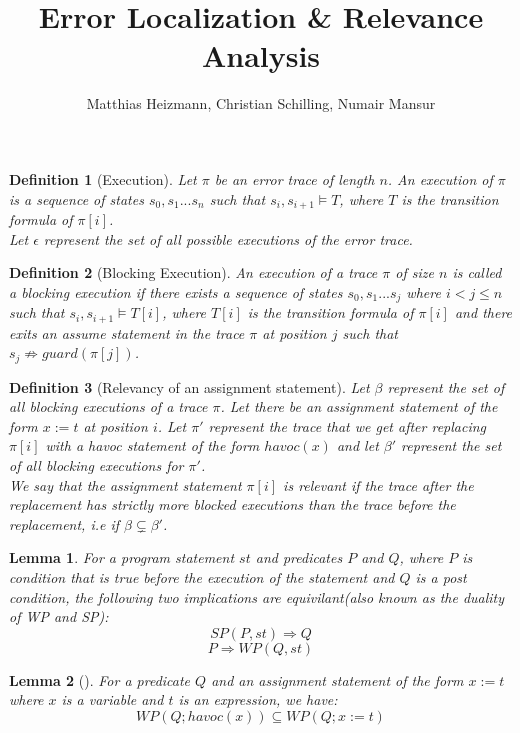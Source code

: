 \documentclass{article}
\title{Error Localization \& Relevance Analysis \\ }
\author{Matthias Heizmann, Christian Schilling, Numair Mansur}
\affil{University of Freiburg, Germany}
\date{\vspace{-5ex}}
\newcommand{\limp}{\Rightarrow}
\newtheorem{mydef}{Definition}
\newtheorem{lemma}{Lemma}
\begin{document}
\begin{mydef}[Execution]\label{mydef:execution_definition}
Let $\pi$ be an error trace of length $n$. An execution of $\pi$ is a sequence of states $s_0, s_1...s_n$ such that $s_i, s_{i+1} \models T$, where $T$ is the transition formula of $\pi[i]$. \\
Let $\epsilon$ represent the set of all possible executions of the error trace.
\end{mydef}

\begin{mydef}[Blocking Execution]\label{mydef:blockingexecution_definition}
An execution of a trace $\pi$ of size $n$ is called a blocking execution if there exists a sequence of states $s_0, s_1...s_j$ where $i<j \leq n$ such that $s_i, s_{i+1} \models T[i]$, where $T[i]$ is the transition formula of $\pi[i]$ and there exits an assume statement in the trace $\pi$ at position $j$ such that $s_{j} \not \limp guard(\pi[j])$.
\end{mydef}

\begin{mydef}[Relevancy of an assignment statement]\label{mydef:relevancy_definition}
Let $\beta$ represent the set of all blocking executions of a trace $\pi$. Let there be an assignment statement of the form $x:=t$ at position $i$. Let $\pi'$ represent the trace that we get after replacing $\pi[i]$ with a havoc statement of the form $havoc(x)$ and let $\beta'$ represent the set of all blocking executions for $\pi'$.\\
We say that the assignment statement $\pi[i]$ is relevant if the trace after the replacement has strictly more blocked executions than the trace before the replacement, i.e if $\beta \subsetneq \beta'$. 
\end{mydef}

\begin{lemma}\label{lemma:duality}
For a program statement $st$ and predicates $P$ and $Q$, where $P$ is condition that is true before the execution of the statement and $Q$ is a post condition, the following two implications are equivilant(also known as the duality of WP and SP):
$$SP(P,st) \Rightarrow Q$$
$$P \Rightarrow WP(Q,st)$$
\end{lemma}

\begin{lemma}[]\label{lemma:rel_bw_assignment_and_havoc}
For a predicate $Q$ and an assignment statement of the form $x:=t$ where $x$ is a variable and $t$ is an expression, we have:
$$WP(Q; havoc(x)) \subseteq WP(Q; x:=t)$$
\end{lemma}
\end{document}
